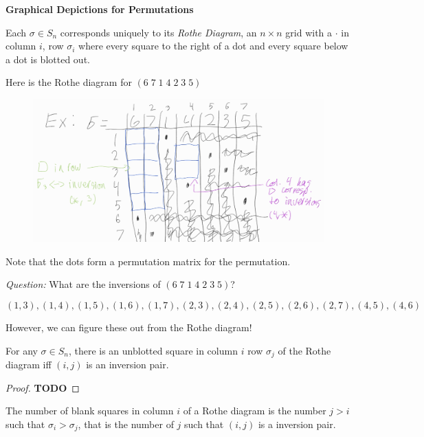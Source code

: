 \noindent\textbf{Graphical Depictions for Permutations}

\begin{definition}
    Each $\sigma\in S_n$ corresponds uniquely to its \textit{Rothe Diagram}, an $n\times n$ grid with a $\cdot$ in column
    $i$, row $\sigma_i$ where every square to the right of a dot and every square below a dot is blotted out.
\end{definition}

\begin{example}
    Here is the Rothe diagram for $(6\;7\;1\;4\;2\;3\;5)$

    \begin{figure}[h]
        \centering
        \includegraphics[scale=0.28]{images/rothe-diagram-1.jpg}
    \end{figure}

\end{example}

\noindent Note that the dots form a permutation matrix for the permutation.

\noindent\textit{Question:} What are the inversions of $(6\;7\;1\;4\;2\;3\;5)$?

\[
    (1,3),(1,4),(1,5),(1,6),(1,7),(2,3),(2,4),(2,5),(2,6),(2,7),(4,5),(4,6)
\]

\noindent However, we can figure these out from the Rothe diagram!

\begin{theorem}
    For any $\sigma\in S_n$, there is an unblotted square in column $i$ row $\sigma_j$ of the Rothe diagram
    iff $(i,j)$ is an inversion pair.
\end{theorem}

\begin{proof}
    \textbf{TODO}
\end{proof}

\begin{corollary}
    The number of blank squares in column $i$ of a Rothe diagram is the number $j>i$ such that $\sigma_i>\sigma_j$,
    that is the number of $j$ such that $(i,j)$ is a inversion pair.
\end{corollary}

